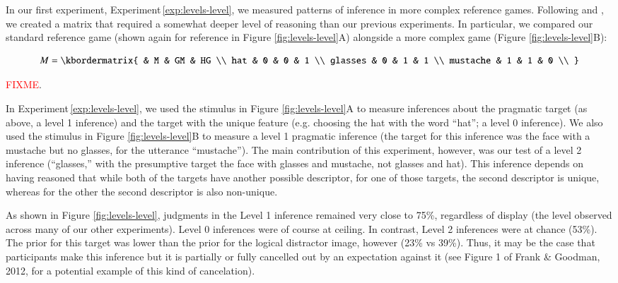 \documentclass[man,noapacite]{apa2}
\newcommand{\red}[1]{\textcolor{red}{#1}}
\newcounter{Experiment}
\newcommand{\exptref}[1]{Experiment\,\ref{#1}}
\begin{document}
In our first experiment, \exptref{exp:levels-level}, we measured patterns of inference in more complex reference games. Following  and , we created a matrix that required a somewhat deeper level of reasoning than our previous experiments. In particular, we compared our standard reference game (shown again for reference in Figure \ref{fig:levels-level}A) alongside a more complex game (Figure \ref{fig:levels-level}B):

\begin{equation}
    M = \kbordermatrix{
      & M & GM & HG \\
      hat & 0 & 0 & 1  \\
      glasses & 0 & 1 & 1 \\
      mustache & 1 & 1 & 0 \\
    }
\end{equation}

\noindent \red{FIXME}.

In \exptref{exp:levels-level}, we used the stimulus in Figure \ref{fig:levels-level}A to measure inferences about the pragmatic target (as above, a level 1 inference) and the target with the unique feature (e.g. choosing the hat with the word ``hat''; a level 0 inference). We also used the stimulus in Figure \ref{fig:levels-level}B to measure a level 1 pragmatic inference (the target for this inference was the face with a mustache but no glasses, for the utterance ``mustache''). The main contribution of this experiment, however, was our test of a level 2 inference (``glasses,'' with the presumptive target the face with glasses and mustache, not glasses and hat). This inference depends on having reasoned that while both of the targets have another possible descriptor, for one of those targets, the second descriptor is unique, whereas for the other the second descriptor is also non-unique.

As shown in Figure \ref{fig:levels-level}, judgments in the Level 1 inference remained very close to 75\%, regardless of display (the level observed across many of our other experiments). Level 0 inferences were of course at ceiling. In contrast, Level 2 inferences were at chance (53\%). The prior for this target was lower than the prior for the logical distractor image, however (23\% vs 39\%). Thus, it may be the case that participants make this inference but it is partially or fully cancelled out by an expectation against it (see Figure 1 of Frank \& Goodman, 2012, for a potential example of this kind of cancelation).
\end{document}
